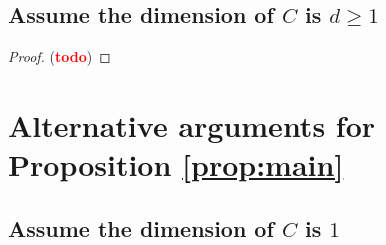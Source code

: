 \documentclass[11pt]{article}
\theoremstyle{definition}
\newtheorem{lemma}{Lemma}
\newcommand{\N}{\mathbb{N}}
\newcommand{\R}{\mathbb{R}}
\newcommand{\vp}{\varphi}
\def\td{(\textcolor{red}{{\bf todo}})}
\def\td{(\textcolor{red}{{\bf todo}}) }
\DeclareMathOperator{\bd}{bd}
\begin{document}
%
%




\subsection*{Assume the dimension of $C$ is $d\geq 1$}
\begin{proof}
\td
\end{proof}




\newpage 


\newpage 







\appendix

\section{Alternative arguments for Proposition \ref{prop:main}}


%
\subsection*{Assume the dimension of $C$ is $1$}

\end{document}
